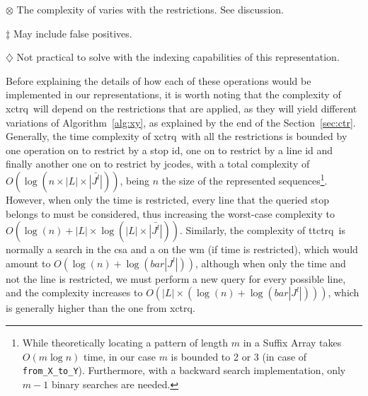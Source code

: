 \begin{threeparttable}
    \begin{tablenotes}
    \item[$\otimes$] The complexity of varies with the restrictions. See discussion.
    \item[$\ddagger$] May include false positives.
    \item[$\diamondsuit$] Not practical to solve with the indexing capabilities of this representation.
    \end{tablenotes}
    \end{threeparttable}
    
    \medskip
    Before explaining the details of how each of these operations would be implemented in our representations, it is worth noting that the complexity of \gls{xctr}q~will depend on the restrictions that are applied, as they will yield different variations of Algorithm~\ref{alg:xy}, as explained by the end of the Section~\ref{sec:ctr}. Generally, the time complexity of \gls{xctr}q~with all the restrictions is bounded by one  operation on  to restrict by a stop id, one on  to restrict by a line id and finally another one on  to restrict by jcodes, with a total complexity of $O(\log(n\times|L|\times\bar{|J^l|}))$, being $n$ the size of the represented sequences\footnote{While theoretically locating a pattern of length $m$ in a Suffix Array takes $O(m \log n)$ time, in our case $m$ is bounded to 2 or 3 (in case of \texttt{from\_X\_to\_Y}). Furthermore, with a backward search implementation, only $m-1$ binary searches are needed.}.
    However, when only the time is restricted, every line that the queried stop belongs to must be considered, thus increasing the worst-case complexity to $O(\log(n) + |L|\times \log(|L|\times\bar{|J^l|}))$. Similarly, the complexity of \gls{ttctr}q~is normally a search in the \gls{csa} and a  on the \gls{wm} (if time is restricted), which would amount to $O(\log(n) + \log(bar{|J^l|}))$, although when only the time and not the line is restricted, we must perform a new query for every possible line, and the complexity increases to $O(|L|\times (\log(n) + \log(bar{|J^l|})))$, which is generally higher than the one from \gls{xctr}q.
    
